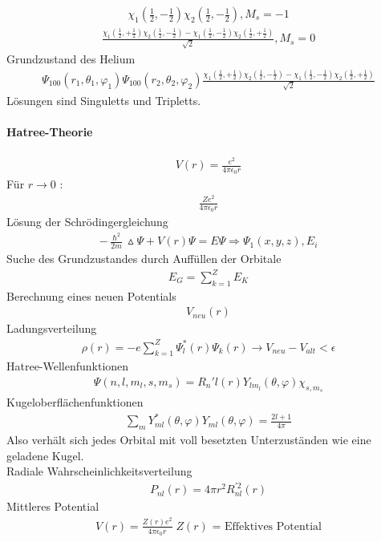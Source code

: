 \documentclass[10pt,a4paper]{article}
\begin{document}
\begin{align}
\chi_1(\frac{1}{2}, -\frac{1}{2}) \chi_2(\frac{1}{2}, -\frac{1}{2}), M_s=-1
\end{align}
\begin{align}
\frac{\chi_1(\frac{1}{2}, +\frac{1}{2}) \chi_2(\frac{1}{2}, -\frac{1}{2}) - \chi_1(\frac{1}{2}, -\frac{1}{2}) \chi_2(\frac{1}{2}, +\frac{1}{2})}{\sqrt{2}} , M_s=0
\end{align}
Grundzustand des Helium
\begin{align}
\Psi_{100} (r_1, \theta_1, \varphi_1) \Psi_{100} (r_2, \theta_2, \varphi_2) \frac{\chi_1(\frac{1}{2}, +\frac{1}{2}) \chi_2(\frac{1}{2}, -\frac{1}{2}) - \chi_1(\frac{1}{2}, -\frac{1}{2}) \chi_2(\frac{1}{2}, +\frac{1}{2})}{\sqrt{2}}
\end{align}
Lösungen sind Singuletts und Tripletts.
\paragraph{Hatree-Theorie}
\begin{align}
V(r) =\frac{e^2}{4 \pi \epsilon_0 r}
\end{align}
Für $r\longrightarrow 0$ :
\begin{align}
\frac{Ze^2}{4 \pi \epsilon_0 r}
\end{align}
Lösung der Schrödingergleichung
\begin{align}
-\frac{\hslash^2}{2m} \vartriangle \Psi + V(r) \Psi = E \Psi \Rightarrow \Psi_1(x,y,z), E_i
\end{align}
Suche des Grundzustandes durch Auffüllen der Orbitale
\begin{align}
E_G=\sum_{k=1}^Z E_K
\end{align}
Berechnung eines neuen Potentials
\begin{align}
V_{neu} (r)
\end{align}
Ladungsverteilung
\begin{align}
\rho (r) =-e \sum_{k=1}^Z \Psi_l^* (r) \Psi_k(r) \longrightarrow V_{neu}-V_{alt} < \epsilon
\end{align}
Hatree-Wellenfunktionen
\begin{align}
\Psi(n,l,m_l,s,m_s)  = R_n' l(r) Y_{lm_l}(\theta,\varphi) \chi_{s,m_s}
\end{align}
Kugeloberflächenfunktionen
\begin{align}
\sum_m Y_{ml}^* (\theta, \varphi) Y_{ml} (\theta, \varphi) = \frac{2 l+1}{4 \pi}
\end{align}
Also verhält sich jedes Orbital mit voll besetzten Unterzuständen wie eine geladene Kugel.\\
Radiale Wahrscheinlichkeitsverteilung
\begin{align}
P_{nl}(r)= 4 \pi r^2 R_{nl}^{'2} (r)
\end{align}
Mittleres Potential
\begin{align}
V(r)= \frac{Z(r) e^2}{4 \pi \epsilon_0 r}  \;Z(r)\text{ = Effektives Potential}
\end{align}
\end{document}
